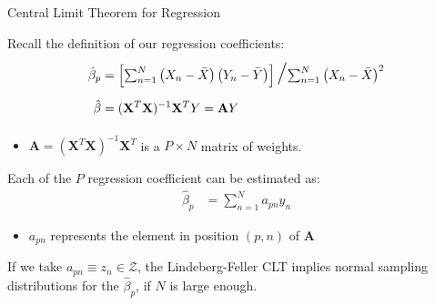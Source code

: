 \documentclass{beamer}\usepackage[]{graphicx}\usepackage[]{color}
\begin{document}

\begin{frame}{Central Limit Theorem for Regression}
 
  Recall the definition of our regression coefficients:
  \begin{align*}
    \hat{\beta}_p &= \left[\textstyle{\sum_{n = 1}^N} \left(X_n - \bar{X}\right)\left(Y_n - \bar{Y}\right) \right] \text{\LARGE $\mathbin{/}$} \textstyle{\sum_{n = 1}^N} \left(X_n - \bar{X}\right)^2\\
    \hat{\beta} &= (\mathbf{X}^T\mathbf{X})^{-1}\mathbf{X}^TY = \mathbf{A}Y
  \end{align*}
  \begin{itemize}
  \item $\mathbf{A} = (\mathbf{X}^T\mathbf{X})^{-1}\mathbf{X}^T$ is a $P \times 
    N$ matrix of
    weights.
  \end{itemize}
  \vc
  \pause
  Each of the $P$ regression coefficient can be estimated as:
  \begin{align*}
    \hat{\beta}_p &= \textstyle{\sum_{n = 1}^N} a_{pn}y_n
  \end{align*}
  \begin{itemize}
  \item $a_{pn}$ represents the element in position $(p,n)$ of $\mathbf{A}$
  \end{itemize}
  \vc
  \pause
  If we take $a_{pn} \equiv z_n \in \mathcal{Z}$, the Lindeberg-Feller CLT
  implies normal sampling distributions for the $\hat{\beta}_p$, if $N$ is large
  enough.
  
\end{frame}
  
\end{document}
